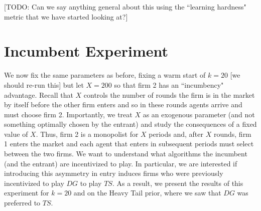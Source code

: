 \documentclass{article}
\theoremstyle{definition}
\begin{document}
[TODO: Can we say anything general about this using the ``learning hardness" metric that we have started looking at?]

\section{Incumbent Experiment}
\label{S:7}

We now fix the same parameters as before, fixing a warm start of $k = 20$ [we should re-run this] but let $X = 200$ so that firm 2 has an ``incumbency" advantage. Recall that $X$ controls the number of rounds the firm is in the market by itself before the other firm enters and so in these rounds agents arrive and must choose firm 2. Importantly, we treat $X$ as an exogenous parameter (and not something optimally chosen by the entrant) and study the consequences of a fixed value of $X$. Thus, firm 2 is a monopolist for $X$ periods and, after $X$ rounds, firm 1 enters the market and each agent that enters in subsequent periods must select between the two firms. We want to understand what algorithms the incumbent (and the entrant) are incentivized to play. In particular, we are interested if introducing this asymmetry in entry induces firms who were previously incentivized to play $DG$ to play $TS$. As a result, we present the results of this experiment for $k = 20$ and on the Heavy Tail prior, where we saw that $DG$ was preferred to $TS$.
\end{document}
